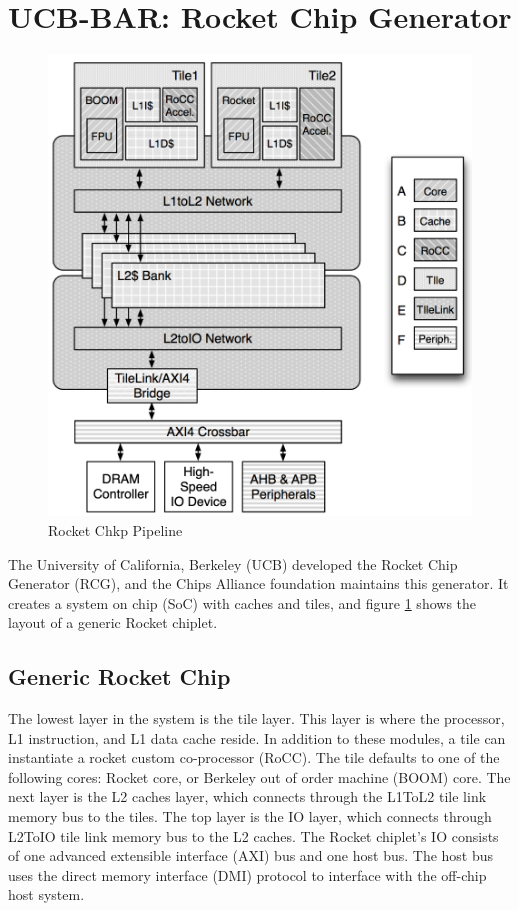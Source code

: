 \documentclass[../main.tex]{subfiles}
\begin{document}
\section{UCB-BAR: Rocket Chip Generator}
\begin{figure}
    \centering
    \includegraphics[scale=.35]{pngs/RocketChipGeneratorLayout.png}
    \caption{Rocket Chkp Pipeline\cite{Asanović:EECS-2016-17}}
    \label{fig:RocketCipGen}
\end{figure}

The University of California, Berkeley (UCB) developed the Rocket Chip Generator (RCG), and the Chips Alliance foundation maintains this generator. It creates a system on chip (SoC) with caches and tiles, and figure \ref{fig:RocketCipGen} shows the layout of a generic Rocket chiplet. 

\subsection{Generic Rocket Chip}
The lowest layer in the system is the tile layer. This layer is where the processor,  L1 instruction, and L1 data cache reside. In addition to these modules, a tile can instantiate a rocket custom co-processor (RoCC).  The tile defaults to one of the following cores: Rocket core, or Berkeley out of order machine (BOOM) core.  The next layer is the L2 caches layer, which connects through the L1ToL2 tile link memory bus to the tiles. The top layer is the IO layer, which connects through L2ToIO tile link memory bus to the L2 caches. The Rocket chiplet's IO consists of one advanced extensible interface (AXI) bus and one host bus. The host bus uses the direct memory interface (DMI) protocol to interface with the off-chip host system. 
\end{document}
